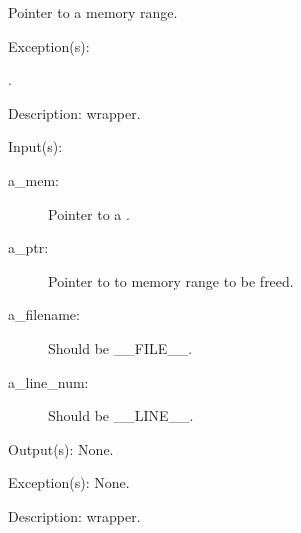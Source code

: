 \begin{capi}
\begin{capilist}
\begin{description}
			Pointer to a memory range.
		\end{description}
	\item[Exception(s): ]
		\begin{description}\item[]
		\item[.]
		\end{description}
	\item[Description: ]
		 wrapper.
	\end{capilist}
\label{mem_free_e}
\label{mem_free}
\label{_cw_free}
	\begin{capilist}
	\item[Input(s): ]
		\begin{description}\item[]
		\item[a\_mem: ]
			Pointer to a .
		\item[a\_ptr: ]
			Pointer to to memory range to be freed.
		\item[a\_filename: ]
			Should be \_\_FILE\_\_.
		\item[a\_line\_num: ]
			Should be \_\_LINE\_\_.
		\end{description}
	\item[Output(s): ] None.
	\item[Exception(s): ] None.
	\item[Description: ]
		 wrapper.
	\end{capilist}
\end{capi}
